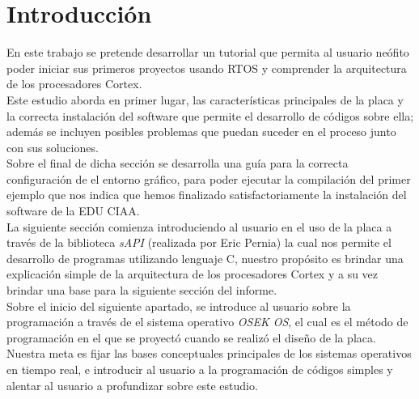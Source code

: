 \documentclass[12pt,letterpaper]{article}
\author{}
\date{}
\begin{document}
%

\tableofcontents


\section{Introducci\'on}
En este trabajo se pretende desarrollar un tutorial que permita al usuario neófito poder iniciar sus primeros proyectos usando RTOS y comprender la arquitectura de los procesadores Cortex.\\
Este estudio aborda en primer lugar, las características principales de la placa y la correcta instalación del software que permite el desarrollo de códigos sobre ella; además se incluyen posibles problemas que puedan suceder en el proceso junto con sus soluciones.\\
Sobre el final de dicha sección se desarrolla una guía para la correcta configuración de el entorno gráfico, para poder ejecutar la compilación del primer ejemplo que nos indica que hemos finalizado satisfactoriamente la instalación del software de la EDU CIAA.\\
La siguiente sección comienza introduciendo al usuario en el uso de la placa a través de la biblioteca \textit{sAPI} (realizada por Eric Pernia) la cual nos permite el desarrollo de programas utilizando lenguaje C, nuestro propósito es brindar una explicación simple de la arquitectura de los procesadores Cortex y a su vez brindar una base para la siguiente sección del informe.\\
Sobre el inicio del siguiente apartado, se introduce al usuario sobre la programación a través de el sistema operativo \textit{OSEK OS}, el cual es el método de programación en el que se proyectó cuando se realizó el diseño de la placa. Nuestra meta es fijar las bases conceptuales principales de los sistemas operativos en tiempo real, e introducir al usuario a la programación de códigos simples y alentar al usuario a profundizar sobre este estudio.
\end{document}
